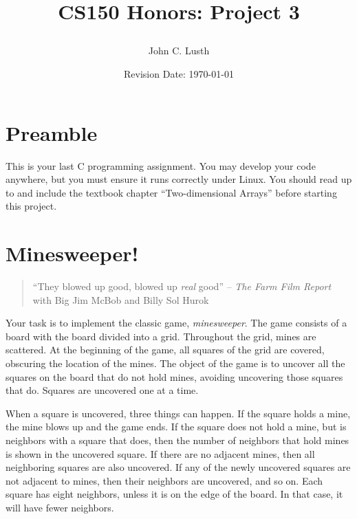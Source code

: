 \documentclass{article}
\title{CS150 Honors: Project 3\\
\date{Revision Date: \today}}
\author{John C. Lusth}
\begin{document}
\maketitle

\thispagestyle{empty}

\W\subsubsection*{}
\W\htmlrule

\section*{Preamble}

This is your last C programming assignment.  You may develop your
code anywhere, but you must ensure it runs correctly under Linux.
You should read up to and include the textbook chapter
``Two-dimensional Arrays'' before starting this project.


\section*{Minesweeper!} 

\begin{quote}
``They blowed up good, blowed up {\it real} good'' --
{\it The Farm Film Report} with Big Jim McBob and Billy Sol Hurok
\end{quote}

Your task is to implement the classic game, {\it minesweeper}.  The game
consists of a board with the board divided into a grid.  Throughout the
grid, mines are scattered.  At the beginning of the game, all squares of
the grid are covered, obscuring the location of the mines.  The object
of the game is to uncover all the squares on the board that do not hold
mines, avoiding uncovering those squares that do. Squares are uncovered
one at a time.

When a square is uncovered, three things can happen. If the square holds
a mine, the mine blows up and the game ends. If the square does not hold
a mine, but is neighbors with a square that does, then the number of
neighbors that hold mines is shown in the uncovered square. If there are
no adjacent mines, then all neighboring squares are also uncovered. If
any of the newly uncovered squares are not adjacent to mines, then their
neighbors are uncovered, and so on.  Each square has eight neighbors,
unless it is on the edge of the board. In that case, it will have fewer
neighbors.
\end{document}
